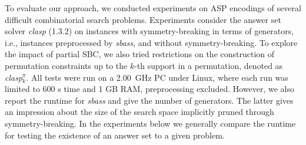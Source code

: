 \documentclass[envcountsame]{llncs}
\newcommand{\systemname}[1]{\emph{#1}}
\begin{document}
To evaluate our approach, we conducted experiments on ASP encodings of several difficult combinatorial search problems. Experiments consider the answer set solver \systemname{clasp} (1.3.2) on instances with symmetry-breaking in terms of generators, i.e., instances preprocessed by \systemname{sbass}, and without symmetry-breaking. To explore the impact of partial SBC, we also tried restrictions on the construction of permutation constraints up to the $k$-th support in a permutation, denoted as \systemname{clasp}$_k^\pi$.
All tests were run on a 2.00~GHz PC under Linux, where each run was limited to 600 s time and 1 GB RAM, preprocessing excluded. However, we also report the runtime for \systemname{sbass} and give the number of generators. The latter gives an impression about the size of the search space implicitly pruned through symmetry-breaking.
In the experiments below we generally compare the runtime for testing the existence of an answer set to a given problem.
\end{document}
